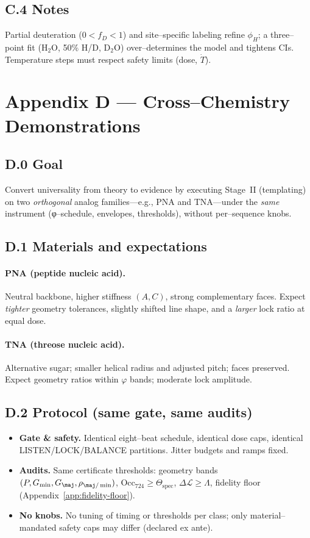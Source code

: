 \documentclass[11pt]{article}
\begin{document}
\subsection*{C.4 Notes}
Partial deuteration ($0<f_D<1$) and site–specific labeling refine $\phi_H$; a three–point fit (H$_2$O, 50\% H/D, D$_2$O) over–determines the model and tightens CIs. Temperature steps must respect safety limits (dose, $\dot T$).


\section*{Appendix D — Cross–Chemistry Demonstrations}\label{app:cross-chem}

\subsection*{D.0 Goal}
Convert universality from theory to evidence by executing Stage~II (templating) on two \emph{orthogonal} analog families—e.g., PNA and TNA—under the \emph{same} instrument (φ–schedule, envelopes, thresholds), without per–sequence knobs.

\subsection*{D.1 Materials and expectations}
\paragraph{PNA (peptide nucleic acid).}
Neutral backbone, higher stiffness $(A,C)$, strong complementary faces. Expect \emph{tighter} geometry tolerances, slightly shifted line shape, and a \emph{larger} lock ratio at equal dose.

\paragraph{TNA (threose nucleic acid).}
Alternative sugar; smaller helical radius and adjusted pitch; faces preserved. Expect geometry ratios within $\varphi$ bands; moderate lock amplitude.

\subsection*{D.2 Protocol (same gate, same audits)}
\begin{itemize}
\item \textbf{Gate \& safety.} Identical eight–beat schedule, identical dose caps, identical LISTEN/LOCK/BALANCE partitions. Jitter budgets and ramps fixed.
\item \textbf{Audits.} Same certificate thresholds: geometry bands $(P,G_{\min},G_{\maj},\rho_{\maj/\min})$, $\mathrm{Occ}_{724}\ge \Theta_{\mathrm{spec}}$, $\Delta\mathcal{L}\ge \Lambda$, fidelity floor (Appendix~\ref{app:fidelity-floor}).
\item \textbf{No knobs.} No tuning of timing or thresholds per class; only material–mandated safety caps may differ (declared ex ante).
\end{itemize}
\end{document}

